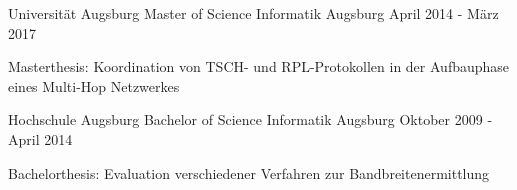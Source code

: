 


\begin{cventries}


\cventry
{Universität Augsburg} %
{Master of Science Informatik} %
{Augsburg} %
{April 2014 - März 2017} %
{ %
\begin{cvitems}
\item {Masterthesis: Koordination von TSCH- und RPL-Protokollen in der Aufbauphase eines Multi-Hop Netzwerkes}
\end{cvitems}
}

\cventry
{Hochschule Augsburg}
{Bachelor of Science Informatik}
{Augsburg}
{Oktober 2009 - April 2014}
{
\begin{cvitems}
\item {Bachelorthesis: Evaluation verschiedener Verfahren zur Bandbreitenermittlung}
\end{cvitems}
}


\end{cventries}
